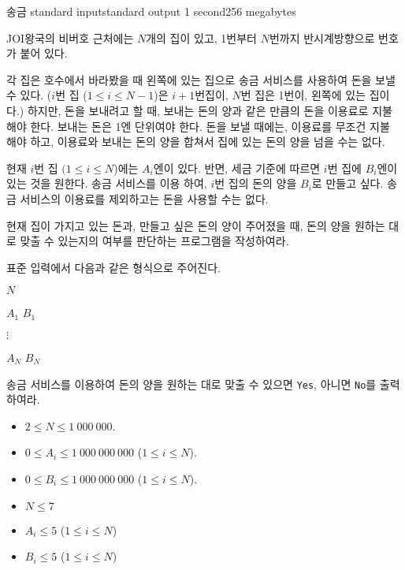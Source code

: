\begin{problem}{송금}
	{standard input}{standard output}
	{1 second}{256 megabytes}{}
	
	JOI왕국의 비버호 근처에는 $N$개의 집이 있고, 1번부터 $N$번까지 반시계방향으로 번호가 붙어 있다.
	
	각 집은 호수에서 바라봤을 때 왼쪽에 있는 집으로 송금 서비스를 사용하여 돈을 보낼 수 있다. ($i$번 집 ($1 \le i \le N-1$)은 $i+1$번집이, $N$번 집은 1번이, 왼쪽에 있는 집이다.) 하지만, 돈을 보내려고 할 때, 보내는 돈의 양과 같은 만큼의 돈을 이용료로 지불 해야 한다. 보내는 돈은 1엔 단위여야 한다. 돈을 보낼 때에는, 이용료를 무조건 지불 해야 하고, 이용료와 보내는 돈의 양을 합쳐서 집에 있는 돈의 양을 넘을 수는 없다.
	
	현재 $i$번 집 $(1 \le i \le N$)에는 $A_i$엔이 있다. 반면, 세금 기준에 따르면 $i$번 집에 $B_i$엔이 있는 것을 원한다. 송금 서비스를 이용 하여, $i$번 집의 돈의 양을 $B_i$로 만들고 싶다. 송금 서비스의 이용료를 제외하고는 돈을 사용할 수는 없다.
	
	현재 집이 가지고 있는 돈과, 만들고 싶은 돈의 양이 주어졌을 때, 돈의 양을 원하는 대로 맞출 수 있는지의 여부를 판단하는 프로그램을 작성하여라.
	
	\InputFile
	
	표준 입력에서 다음과 같은 형식으로 주어진다.
	
	$N$
	
	$A_1$ $B_1$
	
	$\vdots$
	
	$A_N$ $B_N$
	
	\OutputFile
	
	송금 서비스를 이용하여 돈의 양을 원하는 대로 맞출 수 있으면 \texttt{Yes}, 아니면 \texttt{No}를 출력하여라.
	
	\Constraints

	\begin{itemize}
		
		\item $2 \le N \le 1\ 000\ 000$.
		\item $0 \le A_i \le 1\ 000\ 000\ 000$ ($1 \le i \le N$).
		\item $0 \le B_i \le 1\ 000\ 000\ 000$ ($1 \le i \le N$).
		
	\end{itemize}
	
	
	\begin{itemize}
		\item $N \le 7$
		\item $A_i \le 5$ ($1 \le i \le N$)
		\item $B_i \le 5$ ($1 \le i \le N$)
	\end{itemize}
	

\end{problem}
